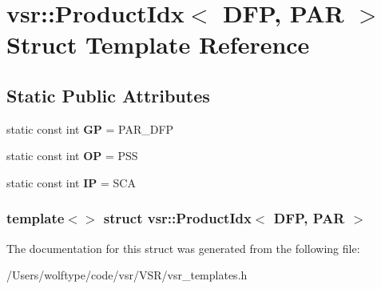 \hypertarget{structvsr_1_1_product_idx_3_01_d_f_p_00_01_p_a_r_01_4}{\section{vsr\-:\-:Product\-Idx$<$ D\-F\-P, P\-A\-R $>$ Struct Template Reference}
\label{structvsr_1_1_product_idx_3_01_d_f_p_00_01_p_a_r_01_4}
}
\subsection*{Static Public Attributes}
\begin{DoxyCompactItemize}
\item 
\hypertarget{structvsr_1_1_product_idx_3_01_d_f_p_00_01_p_a_r_01_4_a5ca03fc52598aa6f401ec8d284ac9390}{static const int {\bfseries G\-P} = P\-A\-R\-\_\-\-D\-F\-P}\label{structvsr_1_1_product_idx_3_01_d_f_p_00_01_p_a_r_01_4_a5ca03fc52598aa6f401ec8d284ac9390}

\item 
\hypertarget{structvsr_1_1_product_idx_3_01_d_f_p_00_01_p_a_r_01_4_a0eb4f7e24eabac98b38367206efd73c9}{static const int {\bfseries O\-P} = P\-S\-S}\label{structvsr_1_1_product_idx_3_01_d_f_p_00_01_p_a_r_01_4_a0eb4f7e24eabac98b38367206efd73c9}

\item 
\hypertarget{structvsr_1_1_product_idx_3_01_d_f_p_00_01_p_a_r_01_4_a99600780e545a630503f4134627b3da8}{static const int {\bfseries I\-P} = S\-C\-A}\label{structvsr_1_1_product_idx_3_01_d_f_p_00_01_p_a_r_01_4_a99600780e545a630503f4134627b3da8}

\end{DoxyCompactItemize}
\subsubsection*{template$<$$>$ struct vsr\-::\-Product\-Idx$<$ D\-F\-P, P\-A\-R $>$}



The documentation for this struct was generated from the following file\-:\begin{DoxyCompactItemize}
\item 
/\-Users/wolftype/code/vsr/\-V\-S\-R/vsr\-\_\-templates.\-h\end{DoxyCompactItemize}
